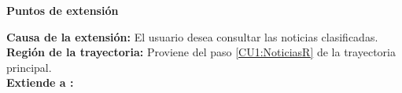 

\begin{large}
	\textbf{Puntos de extensión}\\
\end{large}	

\textbf{Causa de la extensión:} El usuario desea consultar las noticias clasificadas.\\
\textbf{Región de la trayectoria:} Proviene del paso \ref{CU1:NoticiasR} de la trayectoria principal.\\
\textbf{Extiende a :} \\\\


